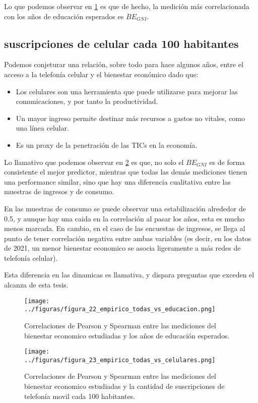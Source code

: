 Lo que podemos observar en \ref{fig:22} es que de hecho, la medición más correlacionada con los años de educación esperados es $BE_{GNI}$. 

\subsection{suscripciones de celular cada 100 habitantes}

Podemos conjeturar una relación, sobre todo para hace algunos años, entre el acceso a la telefonía celular y el bienestar económico dado que:

\begin{itemize}
    \item Los celulares son una herramienta que puede utilizarse para mejorar las comunicaciones, y por tanto la productividad.
    \item Un mayor ingreso permite destinar más recursos a gastos no vitales, como una línea celular.
    \item Es un proxy de la penetración de las TICs en la economía.
\end{itemize}

Lo llamativo que podemos observar en \ref{fig:23} es que, no solo el $BE_{GNI}$ es de forma consistente el mejor predictor, mientras que todas las demás mediciones tienen una performance similar, sino que hay una diferencia cualitativa entre las muestras de ingresos y de consumo.

En las muestras de consumo se puede observar una estabilización alrededor de 0.5, y aunque hay una caida en la correlación al pasar los años, esta es mucho menos marcada. En cambio, en el caso de las encuestas de ingresos, se llega al punto de tener correlación negativa entre ambas variables (es decir, en los datos de 2021, un menor bienestar economico se asocia ligeramente a más redes de telefonía celular).

Esta diferencia en las dinamicas es llamativa, y dispara preguntas que exceden el alcanza de esta tesis.

\begin{figure}[H] %
    \centering %
    \texttt{[image: ../figuras/figura\_22\_empirico\_todas\_vs\_educacion.png]} %
    \caption{Correlaciones de Pearson y Spearman entre las mediciones del bienestar economico estudiadas y los años de educación esperados. \cite{worldbank_gender_data}}
    \label{fig:22} %
\end{figure}


\begin{figure}[H] %
    \centering %
    \texttt{[image: ../figuras/figura\_23\_empirico\_todas\_vs\_celulares.png]} %
    \caption{Correlaciones de Pearson y Spearman entre las mediciones del bienestar economico estudiadas y la cantidad de suscripciones de telefonía movil cada 100 habitantes. \cite{worldbank_gender_data}}
    \label{fig:23} %
\end{figure}